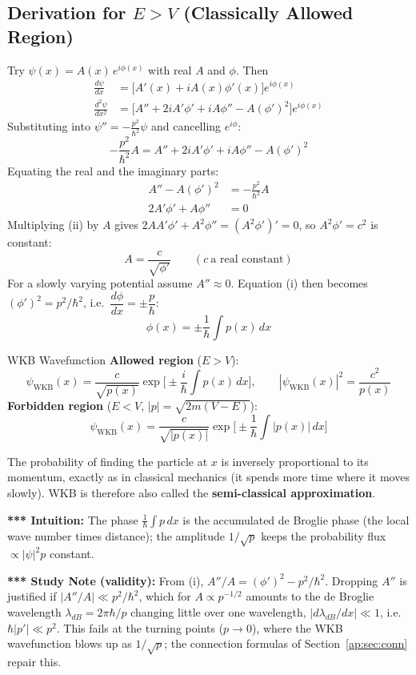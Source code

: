 \documentclass[11pt,a4paper]{article}
\begin{document}
\subsection{\texorpdfstring{Derivation for $E>V$}{Derivation for E>V} (Classically Allowed Region)}
Try $\psi(x) = A(x)\,e^{i\phi(x)}$ with real $A$ and $\phi$. Then
\begin{align*}
\frac{d\psi}{dx} &= \big[A'(x) + iA(x)\phi'(x)\big]e^{i\phi(x)}\\
\frac{d^2\psi}{dx^2} &= \Big[A'' + 2iA'\phi' + iA\phi'' - A(\phi')^2\Big]e^{i\phi(x)}
\end{align*}
Substituting into $\psi'' = -\frac{p^2}{\hbar^2}\psi$ and cancelling $e^{i\phi}$:
\[
-\frac{p^2}{\hbar^2}A = A'' + 2iA'\phi' + iA\phi'' - A(\phi')^2
\]
Equating the real and the imaginary parts:
\begin{align}
A'' - A(\phi')^2 &= -\frac{p^2}{\hbar^2}A \tag{i}\\
2A'\phi' + A\phi'' &= 0 \tag{ii}
\end{align}
Multiplying (ii) by $A$ gives $2AA'\phi' + A^2\phi'' = (A^2\phi')' = 0$, so $A^2\phi' = c^2$ is constant:
\[
A = \frac{c}{\sqrt{\phi'}} \qquad (c\ \text{a real constant})
\]
For a slowly varying potential assume $A''\approx0$. Equation (i) then becomes $(\phi')^2 = p^2/\hbar^2$, i.e.\ $\dfrac{d\phi}{dx} = \pm\dfrac p\hbar$:
\[
\phi(x) = \pm\frac1\hbar\int p(x)\,dx
\]
\begin{thm}{WKB Wavefunction}
\textbf{Allowed region} ($E>V$):
\[
\psi_{\text{WKB}}(x) = \frac{c}{\sqrt{p(x)}}\exp\Big[\pm\frac i\hbar\int p(x)\,dx\Big], \qquad |\psi_{\text{WKB}}(x)|^2 = \frac{c^2}{p(x)}
\]
\textbf{Forbidden region} ($E<V$, $|p| = \sqrt{2m(V-E)}$):
\[
\psi_{\text{WKB}}(x) = \frac{c}{\sqrt{|p(x)|}}\exp\Big[\pm\frac1\hbar\int|p(x)|\,dx\Big]
\]
\end{thm}
The probability of finding the particle at $x$ is inversely proportional to its momentum, exactly as in classical mechanics (it spends more time where it moves slowly). WKB is therefore also called the \textbf{semi-classical approximation}.

\textbf{*** Intuition:} The phase $\frac1\hbar\int p\,dx$ is the accumulated de Broglie phase (the local wave number times distance); the amplitude $1/\sqrt p$ keeps the probability flux $\propto|\psi|^2p$ constant.

\textbf{*** Study Note (validity):} From (i), $A''/A = (\phi')^2 - p^2/\hbar^2$. Dropping $A''$ is justified if $|A''/A|\ll p^2/\hbar^2$, which for $A\propto p^{-1/2}$ amounts to the de Broglie wavelength $\lambda_{dB}=2\pi\hbar/p$ changing little over one wavelength, $|d\lambda_{dB}/dx|\ll1$, i.e.\ $\hbar|p'|\ll p^2$. This fails at the turning points ($p\to0$), where the WKB wavefunction blows up as $1/\sqrt p$; the connection formulas of Section~\ref{ap:sec:conn} repair this.
\end{document}
